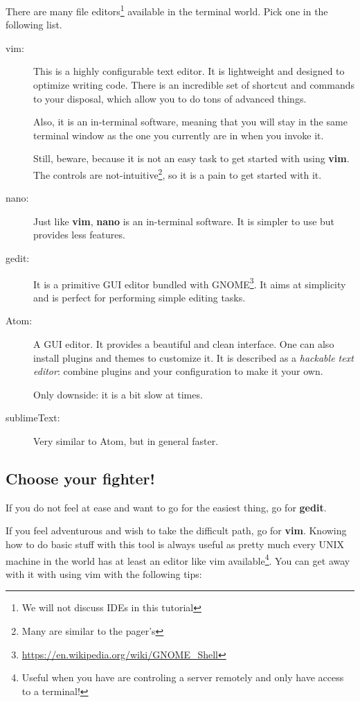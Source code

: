 \documentclass[12pt]{article}
\begin{document}
There are many file editors\footnote{We will not discuss IDEs in this tutorial} available in the terminal world. Pick one in the following list.

\begin{description}
	\item[vim:] This is a highly configurable text editor. It is lightweight and designed to optimize writing code. There is an incredible set of shortcut and commands to your disposal, which allow you to do tons of advanced things.
	
	Also, it is an in-terminal software, meaning that you will stay in the same terminal window as the one you currently are in when you invoke it. 

	Still, beware, because it is not an easy task to get started with using \textbf{vim}. The controls are not-intuitive\footnote{Many are similar to the pager's}, so it is a pain to get started with it.
	\item[nano:] Just like \textbf{vim}, \textbf{nano} is an in-terminal software. It is simpler to use but provides less features.
	\item[gedit:] It is a primitive GUI editor bundled with GNOME\footnote{\url{https://en.wikipedia.org/wiki/GNOME_Shell}}. It aims at simplicity and is perfect for performing simple editing tasks.
	\item[Atom:] A GUI editor. It provides a beautiful and clean interface. One can also install plugins and themes to customize it. It is described as a \textit{hackable text editor}: combine plugins and your configuration to make it your own.
	
	Only downside: it is a bit slow at times.
	\item[sublimeText:] Very similar to Atom, but in general faster.
\end{description}

\subsection{Choose your fighter!}

If you do not feel at ease and want to go for the easiest thing, go for \textbf{gedit}.

If you feel adventurous and wish to take the difficult path, go for \textbf{vim}. Knowing how to do basic stuff with this tool is always useful as pretty much every UNIX machine in the world has at least an editor like vim available\footnote{Useful when you have are controling a server remotely and only have access to a terminal!}. You can get away with it with using vim with the following tips:
\end{document}
